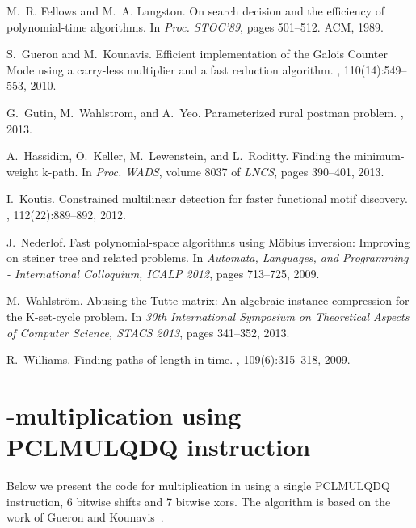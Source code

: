 \documentclass[11pt]{article}
\begin{document}
\begin{thebibliography}{10}
M.~R. Fellows and M.~A. Langston.
\newblock On search decision and the efficiency of polynomial-time algorithms.
\newblock In {\em Proc. STOC'89}, pages 501--512. ACM, 1989.

S.~Gueron and M.~Kounavis.
\newblock Efficient implementation of the {G}alois {C}ounter {M}ode using a
  carry-less multiplier and a fast reduction algorithm.
, 110(14):549--553, 2010.

G.~Gutin, M.~Wahlstrom, and A.~Yeo.
\newblock Parameterized rural postman problem.
, 2013.

A.~Hassidim, O.~Keller, M.~Lewenstein, and L.~Roditty.
\newblock Finding the minimum-weight k-path.
\newblock In {\em Proc. WADS}, volume 8037 of {\em LNCS}, pages 390--401, 2013.

I.~Koutis.
\newblock Constrained multilinear detection for faster functional motif
  discovery.
, 112(22):889--892, 2012.

J.~Nederlof.
\newblock Fast polynomial-space algorithms using {M}{\"o}bius inversion:
  Improving on steiner tree and related problems.
\newblock In {\em Automata, Languages, and Programming - International
  Colloquium, ICALP 2012}, pages 713--725, 2009.

M.~Wahlstr{\"o}m.
\newblock Abusing the {T}utte matrix: An algebraic instance compression for the
  {K}-set-cycle problem.
\newblock In {\em 30th International Symposium on Theoretical Aspects of
  Computer Science, STACS 2013}, pages 341--352, 2013.

R.~Williams.
\newblock Finding paths of length {} in {} time.
, 109(6):315--318, 2009.

\end{thebibliography}

\newpage

\appendix

 \section{-multiplication using PCLMULQDQ instruction}
 \label{sec:clmul-code}
 
 Below we present the code for multiplication in  using a single PCLMULQDQ instruction, 6 bitwise shifts and 7 bitwise xors.
 The algorithm is based on the work of Gueron and Kounavis~\cite{gueron2010efficient}.
 
\end{document}

